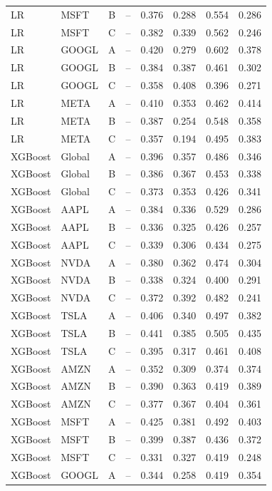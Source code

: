 \documentclass[10pt]{article}
\begin{document}
{\begin{longtable}{@{}l l c c c c c c@{}}
LR & MSFT & B & -- & 0.376 & 0.288 & 0.554 & 0.286 \\
LR & MSFT & C & -- & 0.382 & 0.339 & 0.562 & 0.246 \\
LR & GOOGL & A & -- & 0.420 & 0.279 & 0.602 & 0.378 \\
LR & GOOGL & B & -- & 0.384 & 0.387 & 0.461 & 0.302 \\
LR & GOOGL & C & -- & 0.358 & 0.408 & 0.396 & 0.271 \\
LR & META & A & -- & 0.410 & 0.353 & 0.462 & 0.414 \\
LR & META & B & -- & 0.387 & 0.254 & 0.548 & 0.358 \\
LR & META & C & -- & 0.357 & 0.194 & 0.495 & 0.383 \\
\midrule
XGBoost & Global & A & -- & 0.396 & 0.357 & 0.486 & 0.346 \\
XGBoost & Global & B & -- & 0.386 & 0.367 & 0.453 & 0.338 \\
XGBoost & Global & C & -- & 0.373 & 0.353 & 0.426 & 0.341 \\
XGBoost & AAPL & A & -- & 0.384 & 0.336 & 0.529 & 0.286 \\
XGBoost & AAPL & B & -- & 0.336 & 0.325 & 0.426 & 0.257 \\
XGBoost & AAPL & C & -- & 0.339 & 0.306 & 0.434 & 0.275 \\
XGBoost & NVDA & A & -- & 0.380 & 0.362 & 0.474 & 0.304 \\
XGBoost & NVDA & B & -- & 0.338 & 0.324 & 0.400 & 0.291 \\
XGBoost & NVDA & C & -- & 0.372 & 0.392 & 0.482 & 0.241 \\
XGBoost & TSLA & A & -- & 0.406 & 0.340 & 0.497 & 0.382 \\
XGBoost & TSLA & B & -- & 0.441 & 0.385 & 0.505 & 0.435 \\
XGBoost & TSLA & C & -- & 0.395 & 0.317 & 0.461 & 0.408 \\
XGBoost & AMZN & A & -- & 0.352 & 0.309 & 0.374 & 0.374 \\
XGBoost & AMZN & B & -- & 0.390 & 0.363 & 0.419 & 0.389 \\
XGBoost & AMZN & C & -- & 0.377 & 0.367 & 0.404 & 0.361 \\
XGBoost & MSFT & A & -- & 0.425 & 0.381 & 0.492 & 0.403 \\
XGBoost & MSFT & B & -- & 0.399 & 0.387 & 0.436 & 0.372 \\
XGBoost & MSFT & C & -- & 0.331 & 0.327 & 0.419 & 0.248 \\
XGBoost & GOOGL & A & -- & 0.344 & 0.258 & 0.419 & 0.354 \\

\end{longtable}}
\end{document}

